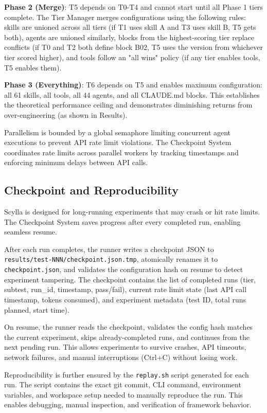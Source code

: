 \documentclass[11pt]{article}
\begin{document}
\textbf{Phase 2 (Merge)}: T5 depends on T0-T4 and cannot start until all Phase 1 tiers complete. The Tier Manager merges configurations using the following rules: skills are unioned across all tiers (if T1 uses skill A and T3 uses skill B, T5 gets both), agents are unioned similarly, blocks from the highest-scoring tier replace conflicts (if T0 and T2 both define block B02, T5 uses the version from whichever tier scored higher), and tools follow an "all wins" policy (if any tier enables tools, T5 enables them).

\textbf{Phase 3 (Everything)}: T6 depends on T5 and enables maximum configuration: all 61 skills, all tools, all 44 agents, and all CLAUDE.md blocks. This establishes the theoretical performance ceiling and demonstrates diminishing returns from over-engineering (as shown in Results).

Parallelism is bounded by a global semaphore limiting concurrent agent executions to prevent API rate limit violations. The Checkpoint System coordinates rate limits across parallel workers by tracking timestamps and enforcing minimum delays between API calls.

\subsection{Checkpoint and Reproducibility}\label{sec:checkpoint}

Scylla is designed for long-running experiments that may crash or hit rate limits. The Checkpoint System saves progress after every completed run, enabling seamless resume.

After each run completes, the runner writes a checkpoint JSON to {\small\texttt{results/test-NNN/checkpoint.json.tmp}}, atomically renames it to \texttt{checkpoint.json}, and validates the configuration hash on resume to detect experiment tampering. The checkpoint contains the list of completed runs (tier, subtest, run\_id, timestamp, pass/fail), current rate limit state (last API call timestamp, tokens consumed), and experiment metadata (test ID, total runs planned, start time).

On resume, the runner reads the checkpoint, validates the config hash matches the current experiment, skips already-completed runs, and continues from the next pending run. This allows experiments to survive crashes, API timeouts, network failures, and manual interruptions (Ctrl+C) without losing work.

Reproducibility is further ensured by the \texttt{replay.sh} script generated for each run. The script contains the exact git commit, CLI command, environment variables, and workspace setup needed to manually reproduce the run. This enables debugging, manual inspection, and verification of framework behavior.
\end{document}
